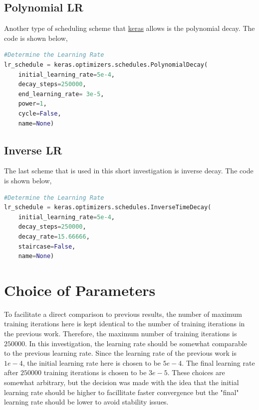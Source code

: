 \documentclass[a4paper, 12pt]{report}
\begin{document}
\begin{center}
\subsection{Polynomial LR}

Another type of scheduling scheme that \url{keras} allows is the polynomial decay. The code is shown below,
\begin{lstlisting}[language=python]
#Determine the Learning Rate
lr_schedule = keras.optimizers.schedules.PolynomialDecay(
    initial_learning_rate=5e-4,
    decay_steps=250000,
    end_learning_rate= 3e-5,
    power=1,
    cycle=False,
    name=None)
\end{lstlisting}

\subsection{Inverse LR}

The last scheme that is used in this short investigation is inverse decay. The code is shown below,
\begin{lstlisting}[language=python]
#Determine the Learning Rate
lr_schedule = keras.optimizers.schedules.InverseTimeDecay(
    initial_learning_rate=5e-4,
    decay_steps=250000,
    decay_rate=15.66666,
    staircase=False,
    name=None)
\end{lstlisting}

\section{Choice of Parameters}

To facilitate a direct comparison to previous results, the number of maximum training iterations here is kept identical to the number of training iterations in the previous work. Therefore, the maximum number of training iterations is $250000$. In this investigation, the learning rate should be somewhat comparable to the previous learning rate. Since the learning rate of the previous work is $1e-4$, the initial learning rate here is chosen to be $5e-4$. The final learning rate after $250000$ training iterations is chosen to be $3e-5$. These choices are somewhat arbitrary, but the decision was made with the idea that the initial learning rate should be higher to facillitate faster convergence but the "final" learning rate should be lower to avoid stability issues.

\end{center}
\end{document}
